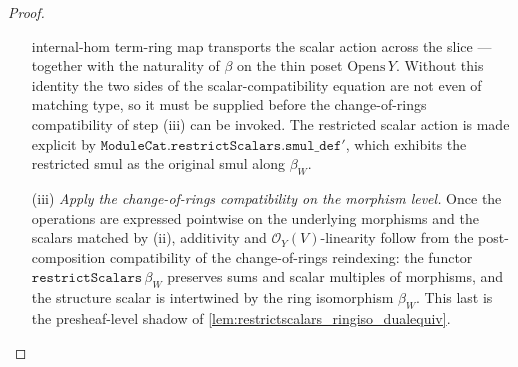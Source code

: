 \begin{proof}
\begin{enumerate}
      internal-hom term-ring map transports the scalar action across the slice --- together with
      the naturality of \(\beta\) on the thin poset \(\mathrm{Opens}\,Y\). Without this identity
      the two sides of the scalar-compatibility equation are not even of matching type, so it
      must be supplied before the change-of-rings compatibility of step (iii) can be invoked.
      The restricted scalar action is made explicit by
      \(\mathtt{ModuleCat.restrictScalars.smul\_def'}\), which exhibits the restricted smul
      as the original smul along \(\beta_W\).
    \item[(iii)] \emph{Apply the change-of-rings compatibility on the morphism level.} Once the
      operations are expressed pointwise on the underlying morphisms and the scalars matched by
      (ii), additivity and
      \(\mathcal{O}_Y(V)\)-linearity follow from the post-composition compatibility of the
      change-of-rings reindexing: the functor \(\mathtt{restrictScalars}\,\beta_W\) preserves sums
      and scalar multiples of morphisms, and the structure scalar is intertwined by the ring
      isomorphism \(\beta_W\). This last is the presheaf-level shadow of
      \cref{lem:restrictscalars_ringiso_dualequiv}.
  \end{enumerate}


\end{proof}
